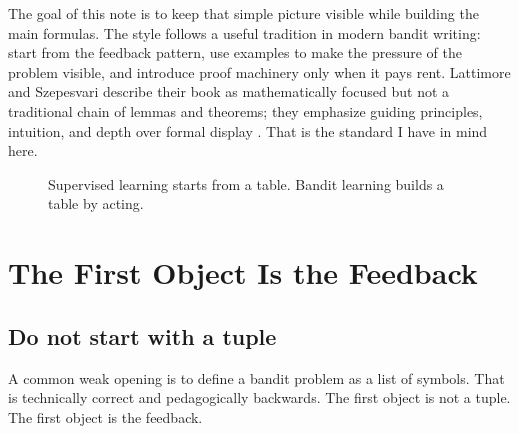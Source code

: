 \documentclass[en,nofont,11pt]{elegantbook}
\begin{document}
The goal of this note is to keep that simple picture visible while building the main formulas. The style follows a useful tradition in modern bandit writing: start from the feedback pattern, use examples to make the pressure of the problem visible, and introduce proof machinery only when it pays rent. Lattimore and Szepesvari describe their book as mathematically focused but not a traditional chain of lemmas and theorems; they emphasize guiding principles, intuition, and depth over formal display \cite{lattimore2020bandit}. That is the standard I have in mind here.

\begin{figure}[h]
\centering
{}
\caption{Supervised learning starts from a table. Bandit learning builds a table by acting.}
\end{figure}

\chapter{The First Object Is the Feedback}

\section{Do not start with a tuple}

A common weak opening is to define a bandit problem as a list of symbols. That is technically correct and pedagogically backwards. The first object is not a tuple. The first object is the feedback.
\end{document}
